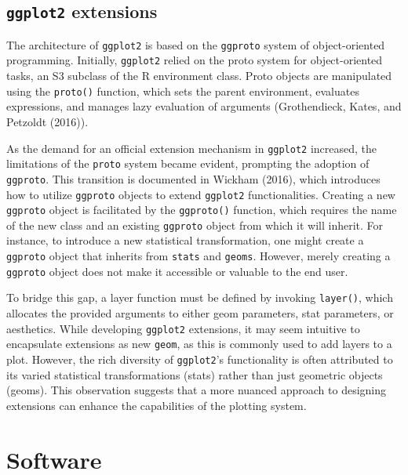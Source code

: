 \hypertarget{ggplot2-extensions}{%
\subsection{\texorpdfstring{\texttt{ggplot2} extensions}{ggplot2 extensions}}\label{ggplot2-extensions}}

The architecture of \texttt{ggplot2} is based on the \texttt{ggproto} system of object-oriented programming. Initially, \texttt{ggplot2} relied on the proto system for object-oriented tasks, an S3 subclass of the R environment class. Proto objects are manipulated using the \texttt{proto()} function, which sets the parent environment, evaluates expressions, and manages lazy evaluation of arguments (Grothendieck, Kates, and Petzoldt (2016)).

As the demand for an official extension mechanism in \texttt{ggplot2} increased, the limitations of the \texttt{proto} system became evident, prompting the adoption of \texttt{ggproto}. This transition is documented in Wickham (2016), which introduces how to utilize \texttt{ggproto} objects to extend \texttt{ggplot2} functionalities. Creating a new \texttt{ggproto} object is facilitated by the \texttt{ggproto()} function, which requires the name of the new class and an existing \texttt{ggproto} object from which it will inherit. For instance, to introduce a new statistical transformation, one might create a \texttt{ggproto} object that inherits from \texttt{stats} and \texttt{geoms}. However, merely creating a \texttt{ggproto} object does not make it accessible or valuable to the end user.

To bridge this gap, a layer function must be defined by invoking \texttt{layer()}, which allocates the provided arguments to either geom parameters, stat parameters, or aesthetics. While developing \texttt{ggplot2} extensions, it may seem intuitive to encapsulate extensions as new \texttt{geom}, as this is commonly used to add layers to a plot. However, the rich diversity of \texttt{ggplot2}'s functionality is often attributed to its varied statistical transformations (stats) rather than just geometric objects (geoms). This observation suggests that a more nuanced approach to designing extensions can enhance the capabilities of the plotting system.

\hypertarget{software}{%
\section{Software}\label{software}}

